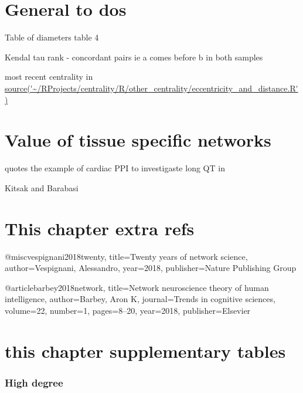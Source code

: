 \section{General to dos}

Table of diameters \cite{crescenzi2013computing}
 table 4 

Kendal tau rank - concordant pairs ie a comes before b in both samples 

most recent centrality in \url{source('~/RProjects/centrality/R/other_centrality/eccentricity_and_distance.R')}


\section{Value of tissue specific networks}
\cite{parikshak2015systems} quotes the example of cardiac PPI to investigaste long QT in \cite{lundby2014annotation}

Kitsak and Barabasi \cite{kitsak2016tissue}

\section{This chapter extra refs}

@misc{vespignani2018twenty,
  title={Twenty years of network science},
  author={Vespignani, Alessandro},
  year={2018},
  publisher={Nature Publishing Group}
}

@article{barbey2018network,
  title={Network neuroscience theory of human intelligence},
  author={Barbey, Aron K},
  journal={Trends in cognitive sciences},
  volume={22},
  number={1},
  pages={8--20},
  year={2018},
  publisher={Elsevier}
}


\section{this chapter supplementary tables}
\subsubsection{High degree}
